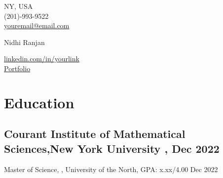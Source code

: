 \documentclass[a4,10pt]{article}
\newcommand{\hskills}[1]{
\textbf{\bfseries #1} }
\begin{document}
\begin{center}
    \begin{minipage}[b]{0.24\textwidth}
            \large NY, USA \\
            \large (201)-993-9522 \\
            \large \href{mailto:youremail@email.com}{youremail@email.com} 
    \end{minipage}%
    \begin{minipage}[b]{0.5\textwidth}
            \centering
            {\HUGE Nidhi Ranjan} \\ %
            \vspace{0.1cm}
    \end{minipage}%
    \begin{minipage}[b]{0.24\textwidth}
            \flushright \large  %
            {\href{https://www.linkedin.com/in/link/}{linkedin.com/in/yourlink} } \\
            \href{https://Add_your_portfolio_here_}{Portfolio}
    \end{minipage}   
    
\end{center}

\section{Education }
\subsection*{Courant Institute of Mathematical Sciences,New York University , \hfill Dec 2022} 
{Master of Science, , {\normalsize \normalfont University of the North, GPA: x.xx/4.00} \hfill Dec 2022} 
\vspace{0.1cm}
\end{document}
